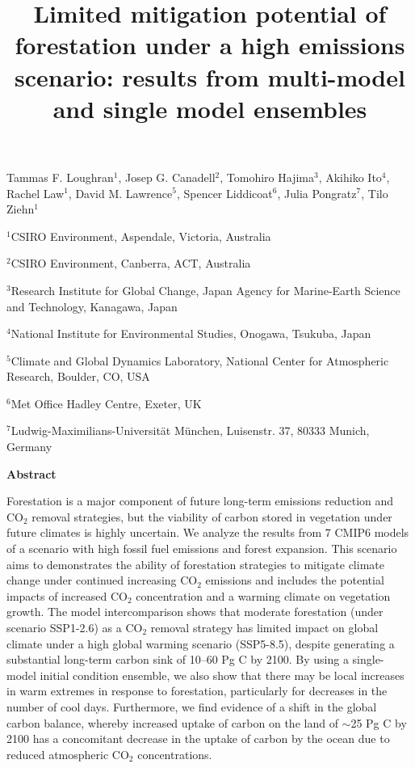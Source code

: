 \documentclass[]{article}
\title{Limited mitigation potential of forestation under a high emissions scenario: results from multi-model and single model ensembles}
\begin{document}
\maketitle

Tammas F. Loughran$^1$,
Josep G. Canadell$^2$,
Tomohiro Hajima$^3$,
Akihiko Ito$^4$,
Rachel Law$^1$,
David M. Lawrence$^5$,
Spencer Liddicoat$^6$,
Julia Pongratz$^7$,
Tilo Ziehn$^1$

\vspace{0.9cm}

$^1$CSIRO Environment, Aspendale, Victoria, Australia

$^2$CSIRO Environment, Canberra, ACT, Australia

$^3$Research Institute for Global Change, Japan Agency for Marine-Earth Science and Technology, Kanagawa, Japan

$^4$National Institute for Environmental Studies, Onogawa, Tsukuba, Japan

$^5$Climate and Global Dynamics Laboratory, National Center for Atmospheric Research, Boulder, CO, USA

$^6$Met Office Hadley Centre, Exeter, UK

$^7$Ludwig-Maximilians-Universität München, Luisenstr. 37, 80333 Munich, Germany

\begin{center}
    \Large
    \vspace{0.9cm}
    \textbf{Abstract}
\end{center}

Forestation is a major component of future long-term emissions reduction and CO$_2$ removal strategies, but the viability of carbon stored in vegetation under future climates is highly uncertain.
We analyze the results from 7 CMIP6 models of a scenario with high fossil fuel emissions and forest expansion.
This scenario aims to demonstrates the ability of forestation strategies to mitigate climate change under continued increasing CO$_2$ emissions and includes the potential impacts of increased CO$_2$ concentration and a warming climate on vegetation growth.
The model intercomparison shows that moderate forestation (under scenario SSP1-2.6)  as a CO$_2$ removal strategy has limited impact on global climate under a high global warming scenario (SSP5-8.5), despite generating a substantial long-term carbon sink of 10--60 Pg C by 2100.
By using a single-model initial condition ensemble, we also show that there may be local increases in warm extremes in response to forestation, particularly for decreases in the number of cool days.
Furthermore, we find evidence of a shift in the global carbon balance, whereby increased uptake of carbon on the land of $\sim$25 Pg C by 2100 has a concomitant decrease in the uptake of carbon by the ocean due to reduced atmospheric CO$_2$ concentrations.
\end{document}
